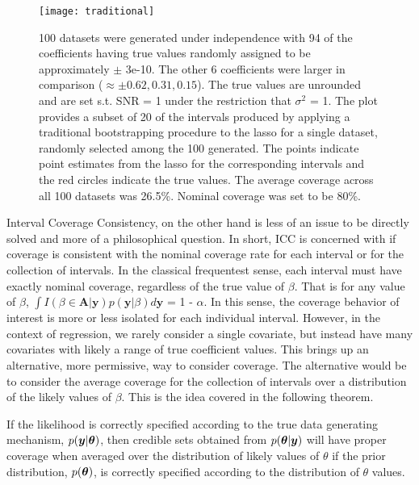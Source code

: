 \begin{figure}[hbtp]
  \begin{center}
    \texttt{[image: traditional]}
    \caption{\label{Fig:traditional} 100 datasets were generated under independence with 94 of the coefficients having true values randomly assigned to be approximately $\pm$ 3e-10. The other 6 coefficients were larger in comparison ($\approx \pm 0.62, 0.31, 0.15$). The true values are unrounded and are set s.t. SNR = 1 under the restriction that $\sigma^2$ = 1. The plot provides a subset of 20 of the intervals produced by applying a traditional bootstrapping procedure to the lasso for a single dataset, randomly selected among the 100 generated. The points indicate point estimates from the lasso for the corresponding intervals and the red circles indicate the true values. The average coverage across all 100 datasets was 26.5\%. Nominal coverage was set to be 80\%.}
  \end{center}
  \end{figure}

Interval Coverage Consistency, on the other hand is less of an issue to be directly solved and more of a philosophical question. In short, ICC is concerned with if coverage is consistent with the nominal coverage rate for each interval or for the collection of intervals. In the classical frequentest sense, each interval must have exactly nominal coverage, regardless of the true value of $\beta$. That is for any value of $\beta$, $\int I(\beta \in \boldsymbol{A} | \boldsymbol{y}) p(\boldsymbol{y} | \beta)d\boldsymbol{y}$ = 1 - $\alpha$. In this sense, the coverage behavior of interest is more or less isolated for each individual interval. However, in the context of regression, we rarely consider a single covariate, but instead have many covariates with likely a range of true coefficient values. This brings up an alternative, more permissive, way to consider coverage. The alternative would be to consider the average coverage for the collection of intervals over a distribution of the likely values of $\beta$. This is the idea covered in the following theorem.

\begin{thm}
  \label{Thm:bcc}
  If the likelihood is correctly specified according to the true data generating mechanism, $p(\boldsymbol{y} | \boldsymbol{\theta})$, then credible sets obtained from $p(\boldsymbol{\theta}|\boldsymbol{y})$ will have proper coverage when averaged over the distribution of likely values of $\theta$ if the prior distribution, $p(\boldsymbol{\theta})$, is correctly specified according to the distribution of $\theta$ values.
\end{thm}

